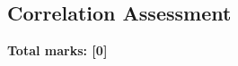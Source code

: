 \documentclass[../s1]{subfiles}
\begin{document}
\subsection*{Correlation Assessment}
\thispagestyle{fancy}



\begin{flushright}
\textbf{Total marks: [0]}
\end{flushright}
\end{document}
